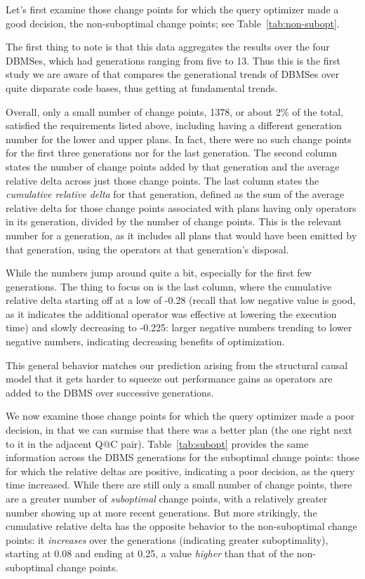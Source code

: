 \documentclass[prodmode,acmtods]{acmsmall}
\begin{document}
Let's first examine those change points for which the query optimizer made a
good decision, the non-suboptimal change points; see
Table~\ref{tab:non-subopt}.

The first thing to note is that this data aggregates the results over the
four \hbox{DBMSes}, which had generations ranging from five to 13. Thus this is the
first study we are aware of that compares the generational trends of \hbox{DBMSes}
over quite disparate code bases, thus getting at fundamental trends.

Overall, only a small number of change points, 1378, or about 2\% of the
total, satisfied the requirements listed above, including having a different
generation number for the lower and upper plans. In fact, there were no such
change points for the first three generations nor for the last
generation. The second column states the number of change points added by
that generation and the average relative delta across just those change
points. The last column states the {\em cumulative relative delta} for that
generation, defined as
the sum of the average relative delta for those change points associated
with plans having only operators in its generation, divided by the number of
change points. This is the relevant number for a generation, as it includes
all plans that would have been emitted by that generation, using the
operators at that generation's disposal.

While the numbers jump around quite a bit, especially for the first few
generations. The thing to focus on is the last column, where the cumulative
relative delta starting off at a low of
-0.28 (recall that low negative value is good, as it indicates the
additional operator was effective at lowering the execution time) and slowly decreasing to -0.225:
larger negative numbers trending to lower negative
numbers, indicating decreasing benefits of optimization.

This general behavior matches our prediction arising from the structural causal model that it
gets harder to squeeze out performance gains as operators are added to the
\hbox{DBMS} over successive generations.

We now examine those change points for which the query optimizer made a poor
decision, in that we can surmise that there was a better plan (the one right
next to it in the adjacent Q@C pair). Table~\ref{tab:subopt} provides the
same information across the \hbox{DBMS} generations for the suboptimal change
points: those for which the
  relative deltas are positive, indicating a poor decision, as the query
  time increased. While there are
  still only a small number of change points, there are a greater number of
  {\em suboptimal} change points, with a relatively greater number showing up at more
  recent generations. But more strikingly, the cumulative relative delta has
  the opposite behavior to the non-suboptimal change points: it {\em
    increases} over the generations (indicating greater suboptimality), starting at 0.08 and ending at 0.25, a
  value {\em higher} than that of the non-suboptimal change points.
\end{document}
